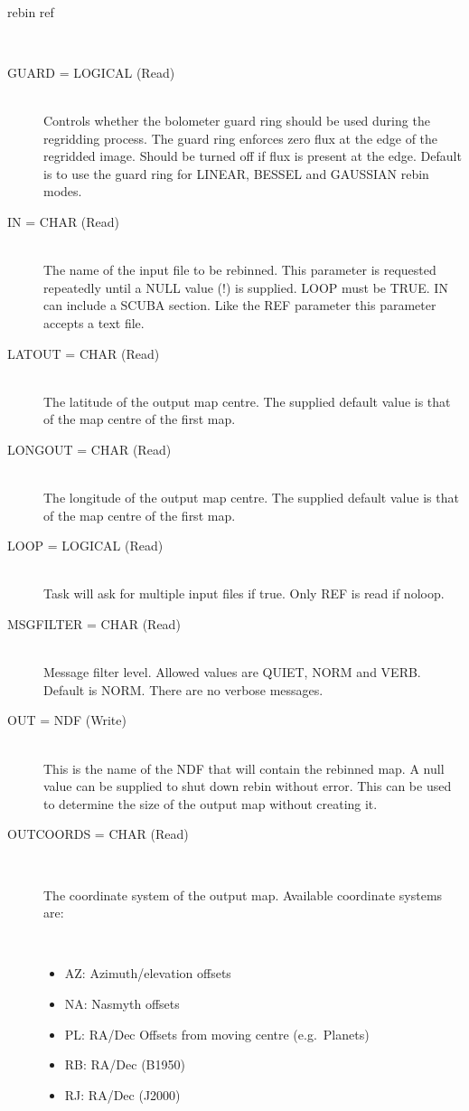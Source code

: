 \documentclass[twoside,11pt]{article}
\newcommand{\htmlref}[2]{#1}
\renewcommand{\_}{\texttt{\symbol{95}}}
\newcommand{\sstusage}[1]{\item[Usage:] \mbox{}
\\[1.3ex]{\raggedright \ssttt #1}}
\newcommand{\sstparameters}[1]{
   \item[Parameters:] \mbox{} \\
   \vspace{-3.5ex}
   \begin{description}
      #1
   \end{description}
}
\newcommand{\sstsubsection}[1]{ \item[{#1}] \mbox{} \\}
\newcommand{\sstitemlist}[1]{
  \mbox{} \\
  \vspace{-3.5ex}
  \begin{itemize}
     #1
  \end{itemize}
}
\newcommand{\sstitem}{\item}
\newcommand{\sstusage}[1]{\item[Usage:]
      \begin{description}
         {\ssttt #1}
      \end{description}
      \\
   }
\newcommand{\sstparameters}[1]{
      \item[Parameters:] \\
      \begin{description}
         #1
      \end{description}
      \\
   }
\newcommand{\sstsubsection}[1]{\item[{#1}]}
\newcommand{\sstitemlist}[1]{
      \begin{itemize}
         #1
      \end{itemize}
      \\
   }
\newcommand{\sstitem}{\item}
\begin{document}
{{{      }
   }
   \sstusage{
      rebin ref
   }
   \sstparameters{
      \sstsubsection{
         GUARD = LOGICAL (Read)
      }{
            Controls whether the bolometer guard ring should be used during
   the regridding process. The guard ring enforces zero flux at the
   edge of the regridded image. Should be turned off if flux is present
   at the edge. Default is to use the guard ring for LINEAR, BESSEL
   and GAUSSIAN rebin modes.
      }
      \sstsubsection{
         IN = CHAR (Read)
      }{
         The name of the input file to be rebinned. This parameter is requested
         repeatedly until a NULL value (!) is supplied. LOOP must be TRUE.
         IN can include a \htmlref{SCUBA section}{sections}.
         Like the REF parameter this parameter accepts a text file.
      }
      \sstsubsection{
         LAT\_OUT = CHAR (Read)
      }{
         The latitude of the output map centre. The supplied default value
         is that of the map centre of the first map.
      }
      \sstsubsection{
         LONG\_OUT = CHAR (Read)
      }{
         The longitude of the output map centre. The supplied default value
         is that of the map centre of the first map.
      }
      \sstsubsection{
         LOOP = LOGICAL (Read)
      }{
         Task will ask for multiple input files if true. Only REF is read
         if noloop.
      }
      \sstsubsection{
         MSG\_FILTER = CHAR (Read)
      }{
         Message filter level. Allowed values are QUIET, NORM and VERB.
         Default is NORM. There are no verbose messages.
      }
      \sstsubsection{
         OUT = NDF (Write)
      }{
         This is the name of the NDF that will contain the rebinned
         map.   A null value can be supplied to shut down rebin without error.
         This can be used to determine the size of the output map
         without creating it. 
      }
      \sstsubsection{
         OUT\_COORDS = CHAR (Read)
      }{
         The coordinate system of the output map. Available coordinate
         systems are:
         \sstitemlist{

            \sstitem
            AZ:  Azimuth/elevation offsets

            \sstitem
            NA:  Nasmyth offsets

            \sstitem
            PL:  RA/Dec Offsets from moving centre (e.g.\ Planets)

            \sstitem
            RB:  RA/Dec (B1950)

            \sstitem
            RJ:  RA/Dec (J2000)

}}}}
\end{document}
